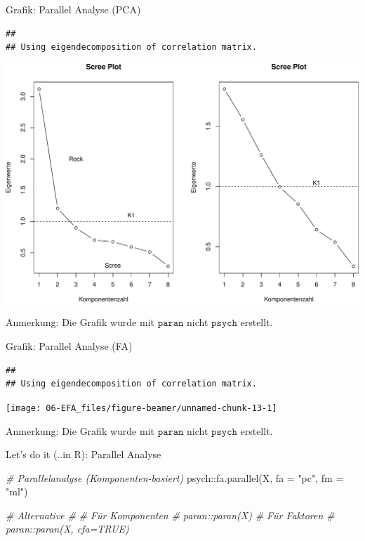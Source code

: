 \documentclass[
  ignorenonframetext,
]{beamer}
\newenvironment{Shaded}{\begin{snugshade}}{\end{snugshade}}
\newcommand{\AttributeTok}[1]{\textcolor[rgb]{0.77,0.63,0.00}{#1}}
\newcommand{\CommentTok}[1]{\textcolor[rgb]{0.56,0.35,0.01}{\textit{#1}}}
\newcommand{\FunctionTok}[1]{\textcolor[rgb]{0.00,0.00,0.00}{#1}}
\newcommand{\NormalTok}[1]{#1}
\newcommand{\SpecialCharTok}[1]{\textcolor[rgb]{0.00,0.00,0.00}{#1}}
\newcommand{\StringTok}[1]{\textcolor[rgb]{0.31,0.60,0.02}{#1}}
\begin{document}
\begin{frame}[fragile]{Grafik: Parallel Analyse (PCA)}
\protect\hypertarget{grafik-parallel-analyse-pca}{}
\begin{verbatim}
## 
## Using eigendecomposition of correlation matrix.
\end{verbatim}

\includegraphics[width=0.7\linewidth]{06-EFA_files/figure-beamer/unnamed-chunk-12-1}

Anmerkung: Die Grafik wurde mit \(\texttt{paran}\) nicht
\(\texttt{psych}\) erstellt.
\end{frame}

\begin{frame}[fragile]{Grafik: Parallel Analyse (FA)}
\protect\hypertarget{grafik-parallel-analyse-fa}{}
\begin{verbatim}
## 
## Using eigendecomposition of correlation matrix.
\end{verbatim}

\texttt{[image: 06-EFA\_files/figure-beamer/unnamed-chunk-13-1]}

Anmerkung: Die Grafik wurde mit \(\texttt{paran}\) nicht
\(\texttt{psych}\) erstellt.
\end{frame}

\begin{frame}[fragile]{Let's do it (..in R): Parallel Analyse}
\protect\hypertarget{lets-do-it-..in-r-parallel-analyse}{}
\begin{Shaded}
\begin{Highlighting}[]
\CommentTok{\# Parallelanalyse (Komponenten{-}basiert)}
\NormalTok{psych}\SpecialCharTok{::}\FunctionTok{fa.parallel}\NormalTok{(X, }\AttributeTok{fa =} \StringTok{"pc"}\NormalTok{, }\AttributeTok{fm =} \StringTok{"ml"}\NormalTok{)}

\CommentTok{\# Alternative}
\CommentTok{\#}
\CommentTok{\# Für Komponenten}
\CommentTok{\# paran::paran(X)}
\CommentTok{\# Für Faktoren}
\CommentTok{\# paran::paran(X, cfa=TRUE)}
\end{Highlighting}
\end{Shaded}
\end{frame}
\end{document}
